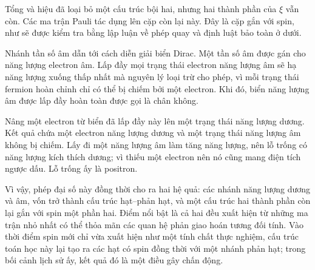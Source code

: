 Tổng và hiệu đã loại bỏ một cấu trúc bội hai, nhưng hai thành phần của \(\xi\) vẫn còn. Các ma trận Pauli tác dụng lên cặp còn lại này. Đây là cặp gắn với spin, như sẽ được kiểm tra bằng lập luận về phép quay và định luật bảo toàn ở dưới.

\begin{classroomqa}
\end{classroomqa}

Nhánh tần số âm dẫn tới cách diễn giải biển Dirac. Một tần số âm được gán cho năng lượng electron âm. Lấp đầy mọi trạng thái electron năng lượng âm sẽ hạ năng lượng xuống thấp nhất mà nguyên lý loại trừ cho phép, vì mỗi trạng thái fermion hoàn chỉnh chỉ có thể bị chiếm bởi một electron. Khi đó, biển năng lượng âm được lấp đầy hoàn toàn được gọi là chân không.

Nâng một electron từ biển đã lấp đầy này lên một trạng thái năng lượng dương. Kết quả chứa một electron năng lượng dương và một trạng thái năng lượng âm không bị chiếm. Lấy đi một năng lượng âm làm tăng năng lượng, nên lỗ trống có năng lượng kích thích dương; vì thiếu một electron nên nó cũng mang điện tích ngược dấu. Lỗ trống ấy là positron.

\begin{classroomqa}
\end{classroomqa}

Vì vậy, phép đại số này đồng thời cho ra hai hệ quả: các nhánh năng lượng dương và âm, vốn trở thành cấu trúc hạt--phản hạt, và một cấu trúc hai thành phần còn lại gắn với spin một phần hai. Điểm nổi bật là cả hai đều xuất hiện từ những ma trận nhỏ nhất có thể thỏa mãn các quan hệ phản giao hoán tương đối tính. Vào thời điểm spin mới chỉ vừa xuất hiện như một tính chất thực nghiệm, cấu trúc toán học này lại tạo ra các hạt có spin đồng thời với một nhánh phản hạt; trong bối cảnh lịch sử ấy, kết quả đó là một điều gây chấn động.

